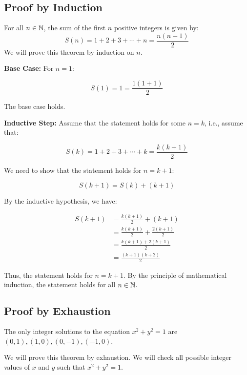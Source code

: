 \QED

\subsection{Proof by Induction}

For all \( n \in \mathbb{N} \), the sum of the first \( n \) positive integers is given by:
\[
	S(n) = 1 + 2 + 3 + \cdots + n = \frac{n(n+1)}{2}
\]
We will prove this theorem by induction on \( n \).
\vspace{\baselineskip}

\textbf{Base Case:} For \( n = 1 \):

\[
	S(1) = 1 = \frac{1(1+1)}{2}
\]

The base case holds.
\vspace{\baselineskip}

\textbf{Inductive Step:} Assume that the statement holds for some \( n = k \), i.e., assume that:
	
\[
	S(k) = 1 + 2 + 3 + \cdots + k = \frac{k(k+1)}{2}
\]
	
We need to show that the statement holds for \( n = k + 1 \):

\[
	S(k+1) = S(k) + (k + 1)
\]
	
By the inductive hypothesis, we have:

\begin{align*}
	S(k+1) &= \frac{k(k+1)}{2} + (k + 1) \\
	&= \frac{k(k+1)}{2} + \frac{2(k + 1)}{2}\\
    &= \frac{k(k+1) + 2(k + 1)}{2} \\
	&= \frac{(k + 1)(k + 2)}{2}	
\end{align*}

Thus, the statement holds for \( n = k + 1 \).
By the principle of mathematical induction, the statement holds for all \( n \in \mathbb{N} \).

\QED

\subsection{Proof by Exhaustion}

The only integer solutions to the equation \( x^2 + y^2 = 1 \) are \( (0, 1), (1, 0), (0, -1), (-1, 0) \).
\vspace{\baselineskip}

We will prove this theorem by exhaustion. We will check all possible integer values of \( x \) and \( y \) such that \( x^2 + y^2 = 1 \).
\vspace{\baselineskip}

